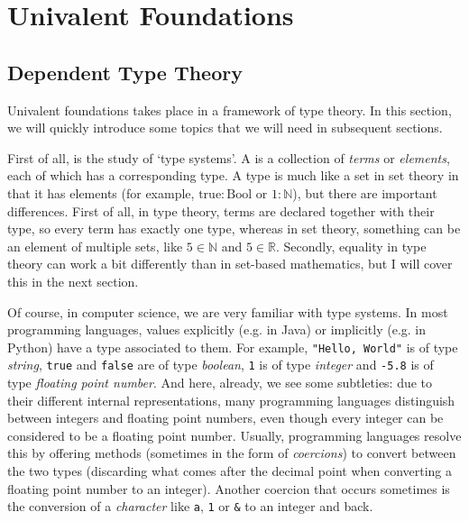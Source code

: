 \chapter{Univalent Foundations}\label{ch:univalent-foundations}

\section{Dependent Type Theory}
Univalent foundations takes place in a framework of type theory. In this section, we will quickly introduce some topics that we will need in subsequent sections.

First of all,  is the study of `type systems'. A  is a collection of \textit{terms} or \textit{elements}, each of which has a corresponding type. A type is much like a set in set theory in that it has elements (for example, $ \mathrm{true}: \mathrm{Bool} $ or $ 1: \mathbb N $), but there are important differences. First of all, in type theory, terms are declared together with their type, so every term has exactly one type, whereas in set theory, something can be an element of multiple sets, like $ 5 \in \mathbb N $ and $ 5 \in \mathbb R $. Secondly, equality in type theory can work a bit differently than in set-based mathematics, but I will cover this in the next section.

Of course, in computer science, we are very familiar with type systems. In most programming languages, values explicitly (e.g. in Java) or implicitly (e.g. in Python) have a type associated to them. For example, \texttt{"Hello, World"} is of type \textit{string}, \texttt{true} and \texttt{false} are of type \textit{boolean}, \texttt{1} is of type \textit{integer} and \texttt{-5.8} is of type \textit{floating point number}. And here, already, we see some subtleties: due to their different internal representations, many programming languages distinguish between integers and floating point numbers, even though every integer can be considered to be a floating point number. Usually, programming languages resolve this by offering methods (sometimes in the form of \textit{coercions}) to convert between the two types (discarding what comes after the decimal point when converting a floating point number to an integer). Another coercion that occurs sometimes is the conversion of a \textit{character} like \texttt{a}, \texttt{1} or \texttt{\&} to an integer and back.


